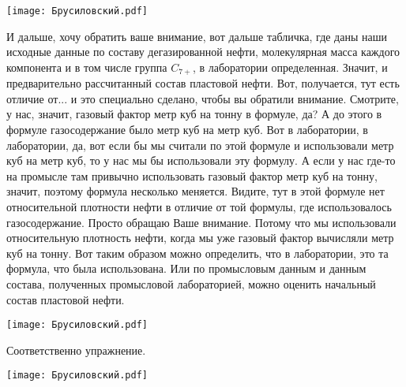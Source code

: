 \documentclass[main.tex]{subfiles}
\begin{document}
\begin{center}
\texttt{[image: Брусиловский.pdf]}
\end{center}

И дальше, хочу обратить ваше внимание, вот дальше табличка, где даны наши исходные данные по составу дегазированной нефти, молекулярная масса каждого компонента и в том числе группа $C_{7+}$, в лаборатории определенная.
Значит, и предварительно рассчитанный состав пластовой нефти.
Вот, получается, тут есть отличие от... и это специально сделано, чтобы вы обратили внимание.
Смотрите, у нас, значит, газовый фактор метр куб на тонну в формуле, да?
А до этого в формуле газосодержание было метр куб на метр куб.
Вот в лаборатории, в лаборатории, да, вот если бы мы считали по этой формуле и использовали метр куб на метр куб, то у нас мы бы использовали эту формулу.
А если у нас где-то на промысле там привычно использовать газовый фактор метр куб на тонну, значит, поэтому формула несколько меняется.
Видите, тут в этой формуле нет относительной плотности нефти в отличие от той формулы, где использовалось газосодержание.
Просто обращаю Ваше внимание.
Потому что мы использовали относительную плотность нефти, когда мы уже газовый фактор вычисляли метр куб на тонну.
Вот таким образом можно определить, что в лаборатории, это та формула, что была использована.
Или по промысловым данным и данным состава, полученных промысловой лабораторией, можно оценить начальный состав пластовой нефти.

\begin{center}
\texttt{[image: Брусиловский.pdf]}
\end{center}

Соответственно упражнение.

\begin{center}
\texttt{[image: Брусиловский.pdf]}
\end{center}
\end{document}
